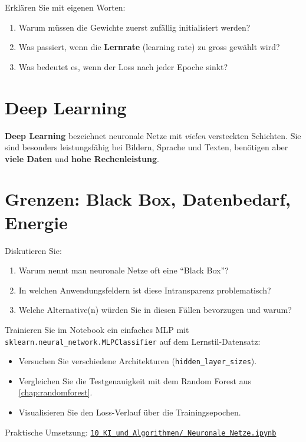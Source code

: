 \begin{myexercise}
Erklären Sie mit eigenen Worten:
\begin{enumerate}
    \item Warum müssen die Gewichte zuerst zufällig initialisiert werden?
    \item Was passiert, wenn die \textbf{Lernrate} (learning rate) zu gross gewählt wird?
    \item Was bedeutet es, wenn der Loss nach jeder Epoche sinkt?
\end{enumerate}
\end{myexercise}

\section{Deep Learning}

\begin{myremark}
\textbf{Deep Learning} bezeichnet neuronale Netze mit \emph{vielen} versteckten Schichten.
Sie sind besonders leistungsfähig bei Bildern, Sprache und Texten,
benötigen aber \textbf{viele Daten} und \textbf{hohe Rechenleistung}.
\end{myremark}

\section{Grenzen: Black Box, Datenbedarf, Energie}

\begin{myexercise}
Diskutieren Sie:
\begin{enumerate}
    \item Warum nennt man neuronale Netze oft eine \enquote{Black Box}?
    \item In welchen Anwendungsfeldern ist diese Intransparenz problematisch?
    \item Welche Alternative(n) würden Sie in diesen Fällen bevorzugen und warum?
\end{enumerate}
\end{myexercise}

\begin{mychallenge}
Trainieren Sie im Notebook ein einfaches MLP mit \texttt{sklearn.neural\_network.MLPClassifier}
auf dem Lernstil-Datensatz:
\begin{itemize}
    \item Versuchen Sie verschiedene Architekturen (\texttt{hidden\_layer\_sizes}).
    \item Vergleichen Sie die Testgenauigkeit mit dem Random Forest aus \cref{chap:randomforest}.
    \item Visualisieren Sie den Loss-Verlauf über die Trainingsepochen.
\end{itemize}
\end{mychallenge}

\begin{myremark}[Notebook]
Praktische Umsetzung:\newline
\href{\notebookurl}{\texttt{10\_KI\_und\_Algorithmen/\_Neuronale\_Netze.ipynb}}
\end{myremark}
